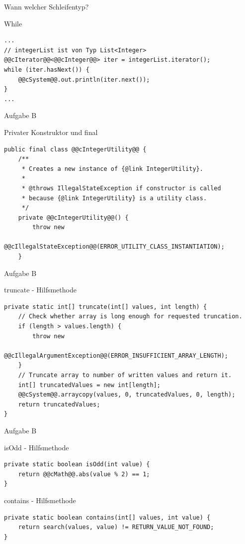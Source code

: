 \documentclass[aspectratio=169]{beamer}
\begin{document}
\begin{frame}[fragile]{Wann welcher Schleifentyp?}
  \begin{exampleblock}{While}
    \begin{lstlisting}
...
// integerList ist von Typ List<Integer>
@@cIterator@@<@@cInteger@@> iter = integerList.iterator();
while (iter.hasNext()) {
    @@cSystem@@.out.println(iter.next());
}
...
    \end{lstlisting}
  \end{exampleblock}
\end{frame}

\begin{frame}[fragile]{Aufgabe B}
  \begin{block}{Privater Konstruktor und \color{keywordcolor}final}
    \begin{lstlisting}
public final class @@cIntegerUtility@@ {
    /**
     * Creates a new instance of {@link IntegerUtility}.
     *
     * @throws IllegalStateException if constructor is called
     * because {@link IntegerUtility} is a utility class.
     */
    private @@cIntegerUtility@@() {
        throw new
            @@cIllegalStateException@@(ERROR_UTILITY_CLASS_INSTANTIATION);
    }
    \end{lstlisting}
  \end{block}
\end{frame}

\begin{frame}[fragile]{Aufgabe B}
  \begin{block}{truncate - Hilfsmethode}
    \begin{lstlisting}
private static int[] truncate(int[] values, int length) {
    // Check whether array is long enough for requested truncation.
    if (length > values.length) {
        throw new
            @@cIllegalArgumentException@@(ERROR_INSUFFICIENT_ARRAY_LENGTH);
    }
    // Truncate array to number of written values and return it.
    int[] truncatedValues = new int[length];
    @@cSystem@@.arraycopy(values, 0, truncatedValues, 0, length);
    return truncatedValues;
}
    \end{lstlisting}
  \end{block}
\end{frame}

\begin{frame}[fragile]{Aufgabe B}
  \begin{block}{isOdd - Hilfsmethode}
    \begin{lstlisting}
private static boolean isOdd(int value) {
    return @@cMath@@.abs(value % 2) == 1;
}
    \end{lstlisting}
  \end{block}

  \pause

  \begin{block}{contains - Hilfsmethode}
    \begin{lstlisting}
private static boolean contains(int[] values, int value) {
    return search(values, value) != RETURN_VALUE_NOT_FOUND;
}
    \end{lstlisting}
  \end{block}
\end{frame}
\end{document}
